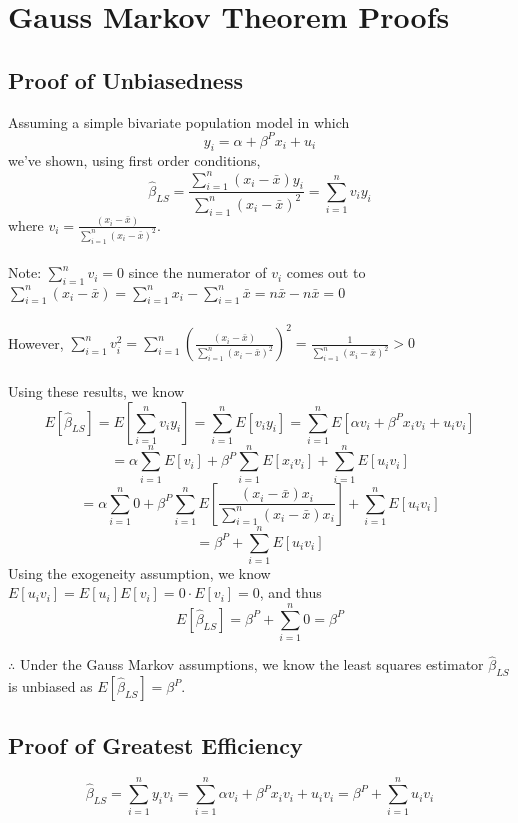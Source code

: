 \documentclass[11pt,letterhead]{article}
\begin{document}
\section{Gauss Markov Theorem Proofs}
\subsection{Proof of Unbiasedness}
Assuming a simple bivariate population model in which $$y_i=\alpha+\beta^Px_i+u_i$$
we've shown, using first order conditions, $$\hat{\beta}_{LS}=\frac{\sum_{i=1}^n (x_i-\bar{x})y_i}{\sum_{i=1}^n(x_i-\bar{x})^2}=\sum_{i=1}^n v_i y_i$$
where $v_i=\frac{(x_i-\bar{x})}{\sum_{i=1}^n (x_i-\bar{x})^2}$.\\~\\
Note: $\sum_{i=1}^n v_i=0$ since the numerator of $v_i$ comes out to $\sum_{i=1}^n (x_i-\bar{x})= \sum_{i=1}^n x_i - \sum_{i=1}^n \bar{x}=n\bar{x}-n\bar{x}=0$\\~\\
However, $\sum_{i=1}^n v_i^2=\sum_{i=1}^n (\frac{(x_i-\bar{x})}{\sum_{i=1}^n (x_i-\bar{x})^2})^2=\frac{1}{\sum_{i=1}^n (x_i-\bar{x})^2}>0$\\~\\
Using these results, we know $$E[\hat{\beta}_{LS}]=E[\sum_{i=1}^n v_i y_i]=\sum_{i=1}^n E[v_i y_i]=\sum_{i=1}^n E[\alpha v_i + \beta^P x_i v_i+u_i v_i]$$
$$=\alpha \sum_{i=1}^n E[v_i] + \beta^P \sum_{i=1}^n E[x_i v_i]+\sum_{i=1}^n E[u_i v_i]$$
$$=\alpha \sum_{i=1}^n 0 + \beta^P \sum_{i=1}^n E[\frac{(x_i-\bar{x})x_i}{\sum_{i=1}^n(x_i-\bar{x})x_i}]+\sum_{i=1}^n E[u_i v_i]$$
$$=\beta^P+\sum_{i=1}^n E[u_i v_i]$$
Using the exogeneity assumption, we know $E[u_i v_i]=E[u_i]E[v_i]=0\cdot E[v_i]=0$, and thus
$$E[\hat{\beta}_{LS}]=\beta^P+\sum_{i=1}^n 0=\beta^P$$


$\therefore$ Under the Gauss Markov assumptions, we know the least squares estimator $\hat{\beta}_{LS}$ is unbiased as $E[\hat{\beta}_{LS}]=\beta^P$.
\newpage
\subsection{Proof of Greatest Efficiency}
$$\hat{\beta}_{LS}=\sum_{i=1}^n y_i v_i = \sum_{i=1}^n \alpha v_i + \beta^P x_i v_i+u_i v_i= \beta^P + \sum_{i=1}^n u_i v_i$$
\end{document}
